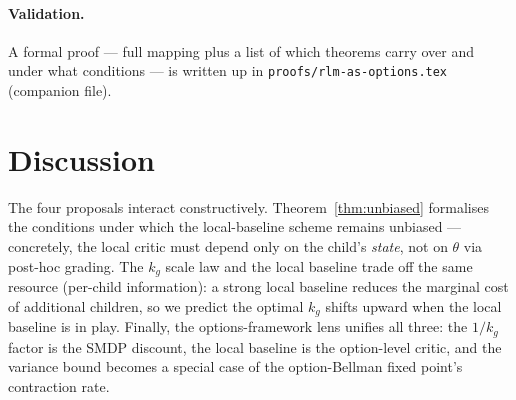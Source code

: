 \documentclass[11pt]{article}
\begin{document}
\paragraph{Validation.} A formal proof — full mapping plus a list of which
\citet{sutton1999options} theorems carry over and under what conditions — is
written up in \texttt{proofs/rlm-as-options.tex} (companion file).

\section*{Discussion}

The four proposals interact constructively. Theorem~\ref{thm:unbiased}
formalises the conditions under which the local-baseline scheme remains
unbiased — concretely, the local critic must depend only on the child's
\emph{state}, not on $\theta$ via post-hoc grading. The $k_g$ scale law and
the local baseline trade off the same resource (per-child information): a
strong local baseline reduces the marginal cost of additional children, so
we predict the optimal $k_g$ shifts upward when the local baseline is in
play. Finally, the options-framework lens unifies all three: the $1/k_g$
factor is the SMDP discount, the local baseline is the option-level critic,
and the variance bound becomes a special case of the option-Bellman fixed
point's contraction rate.



\end{document}
